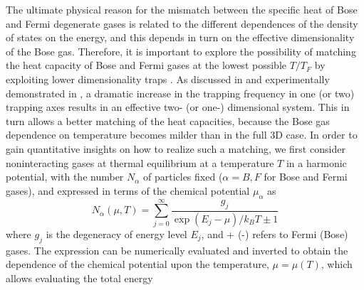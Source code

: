 \documentclass[pra,letterpaper,twocolumn,showpacs,superscriptaddress]{revtex4}
\begin{document}
The ultimate physical reason for the mismatch between the specific heat of Bose and Fermi degenerate gases is related to the 
different dependences of the density of states on the energy, and this depends in turn on the effective dimensionality of the Bose gas. 
Therefore, it is important to explore the possibility of matching the heat capacity of Bose and Fermi gases at the lowest possible $T/T_F$ 
by exploiting lower dimensionality traps \cite{Brown2008}.  As discussed in \cite{Rehr1970,Bagnato1991} and experimentally demonstrated in 
\cite{Ketterle1996,Moritz1994}, a dramatic increase in the trapping frequency in one (or two) trapping axes results in an effective two- 
(or one-) dimensional system. This in turn allows a better matching of the heat capacities, because the Bose gas dependence on 
temperature becomes milder than in the full 3D case. In order to gain quantitative insights on how to realize such a matching, we 
first consider noninteracting gases at thermal equilibrium at a temperature $T$ in a harmonic potential, with the number $N_\alpha$ 
of particles fixed ($\alpha=B,F$ for Bose and Fermi gases), and expressed in terms of the chemical potential $\mu_\alpha$ as 
\begin{equation}
N_\alpha(\mu, T) = \sum_{j=0}^{\infty} \frac{g_j}{\exp{(E_j - \mu)/k_B T} \pm 1}
\end{equation}
where $g_{j}$ is the degeneracy of energy level $E_{j}$, and + (-) refers to Fermi (Bose) gases.
The expression can be  numerically evaluated and inverted to obtain the dependence of the chemical potential upon the temperature, 
$\mu = \mu (T)$, which allows evaluating the total energy 
\end{document}
